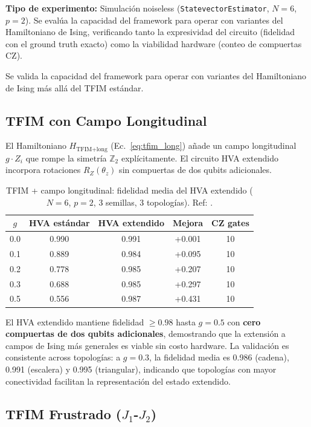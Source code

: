 \documentclass[11pt,a4paper,spanish]{book}
\begin{document}
\textbf{Tipo de experimento:} Simulación noiseless (\texttt{StatevectorEstimator}, $N = 6$, $p = 2$). Se evalúa la capacidad del framework para operar con variantes del Hamiltoniano de Ising, verificando tanto la expresividad del circuito (fidelidad con el ground truth exacto) como la viabilidad hardware (conteo de compuertas CZ).

Se valida la capacidad del framework para operar con variantes del Hamiltoniano de Ising más allá del TFIM estándar.

\subsection{TFIM con Campo Longitudinal}

El Hamiltoniano $H_{\text{TFIM+long}}$ (Ec.~\ref{eq:tfim_long}) añade un campo longitudinal $g \cdot Z_i$ que rompe la simetría $\mathbb{Z}_2$ explícitamente. El circuito HVA extendido incorpora rotaciones $R_Z(\theta_z)$ sin compuertas de dos qubits adicionales.

\begin{table}[h]
\centering
\caption{TFIM + campo longitudinal: fidelidad media del HVA extendido ($N = 6$, $p = 2$, 3 semillas, 3 topologías). Ref: \citet{dutta2015}.}
\label{tab:tfim_long}
\begin{tabular}{ccccc}
\toprule
\textbf{$g$} & \textbf{HVA estándar} & \textbf{HVA extendido} & \textbf{Mejora} & \textbf{CZ gates} \\
\midrule
0.0 & 0.990 & 0.991 & +0.001 & 10 \\
0.1 & 0.889 & 0.984 & +0.095 & 10 \\
0.2 & 0.778 & 0.985 & +0.207 & 10 \\
0.3 & 0.688 & 0.985 & +0.297 & 10 \\
0.5 & 0.556 & 0.987 & +0.431 & 10 \\
\bottomrule
\end{tabular}
\end{table}

El HVA extendido mantiene fidelidad $\geq 0.98$ hasta $g = 0.5$ con \textbf{cero compuertas de dos qubits adicionales}, demostrando que la extensión a campos de Ising más generales es viable sin costo hardware. La validación es consistente across topologías: a $g = 0.3$, la fidelidad media es 0.986 (cadena), 0.991 (escalera) y 0.995 (triangular), indicando que topologías con mayor conectividad facilitan la representación del estado extendido.

\subsection{TFIM Frustrado ($J_1$-$J_2$)}
\end{document}
